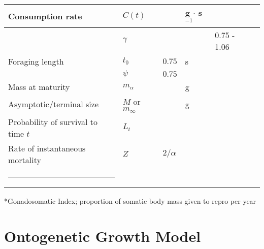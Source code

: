 \documentclass[a4paper]{article} %
\makeatletter
\newcommand{\thickhline}{%
    \noalign {\ifnum 0=`}\fi \hrule height 1pt
    \futurelet \reserved@a \@xhline
}
\makeatother
\begin{document}
\begin{table}[H]
\begin{tabularx}{\linewidth}{Xlllll}
    Consumption rate                            & $C(t)$                &                           & g $\cdot$ s$^{-1}$    &                                   &                       \\ \hline
                                                & $\gamma$              &                           & \textsc{}             & 0.75 - 1.06                       & \cite{Pawar2012}      \\ \hline
    Foraging length                             & $t_0$                 & $0.75$                    & s                     &                                   &                       \\
                                                & $\psi$                & $0.75$                    &                       &                                   &                       \\ \hline
    Mass at maturity                            & $m_{\alpha}$          &                           & g                     &                                   &                       \\ \hline
    Asymptotic/terminal size                    & $M$ or $m_{\infty}$   &                           & g                     &                                   &                       \\ \hline
    Probability of survival to time $t$         & $L_t$                 &                           & \textsc{}             &                                   &                       \\ \hline
    Rate of instantaneous mortality             & $Z$                   & $2/\alpha$                &                       &                                   &                       \\ \thickhline
    \end{tabularx}
\end{table}
*Gonadosomatic Index; proportion of somatic body mass given to repro per year


\section{Ontogenetic Growth Model}
\end{document}

